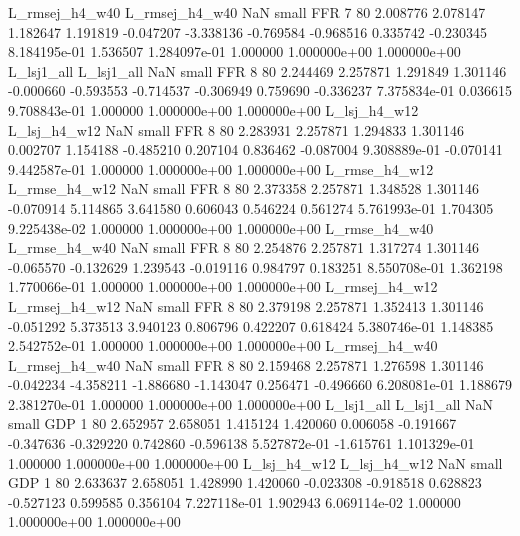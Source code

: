 L_rmsej_h4_w40 L_rmsej_h4_w40                   NaN      small      FFR                 7 80 2.008776       2.078147 1.182647       1.191819   -0.047207     -3.338136     -0.769584    -0.968516       0.335742 -0.230345 8.184195e-01     1.536507   1.284097e-01            1.000000    1.000000e+00        1.000000e+00
    L_lsj1_all     L_lsj1_all                   NaN      small      FFR                 8 80 2.244469       2.257871 1.291849       1.301146   -0.000660     -0.593553     -0.714537    -0.306949       0.759690 -0.336237 7.375834e-01     0.036615   9.708843e-01            1.000000    1.000000e+00        1.000000e+00
  L_lsj_h4_w12   L_lsj_h4_w12                   NaN      small      FFR                 8 80 2.283931       2.257871 1.294833       1.301146    0.002707      1.154188     -0.485210     0.207104       0.836462 -0.087004 9.308889e-01    -0.070141   9.442587e-01            1.000000    1.000000e+00        1.000000e+00
 L_rmse_h4_w12  L_rmse_h4_w12                   NaN      small      FFR                 8 80 2.373358       2.257871 1.348528       1.301146   -0.070914      5.114865      3.641580     0.606043       0.546224  0.561274 5.761993e-01     1.704305   9.225438e-02            1.000000    1.000000e+00        1.000000e+00
 L_rmse_h4_w40  L_rmse_h4_w40                   NaN      small      FFR                 8 80 2.254876       2.257871 1.317274       1.301146   -0.065570     -0.132629      1.239543    -0.019116       0.984797  0.183251 8.550708e-01     1.362198   1.770066e-01            1.000000    1.000000e+00        1.000000e+00
L_rmsej_h4_w12 L_rmsej_h4_w12                   NaN      small      FFR                 8 80 2.379198       2.257871 1.352413       1.301146   -0.051292      5.373513      3.940123     0.806796       0.422207  0.618424 5.380746e-01     1.148385   2.542752e-01            1.000000    1.000000e+00        1.000000e+00
L_rmsej_h4_w40 L_rmsej_h4_w40                   NaN      small      FFR                 8 80 2.159468       2.257871 1.276598       1.301146   -0.042234     -4.358211     -1.886680    -1.143047       0.256471 -0.496660 6.208081e-01     1.188679   2.381270e-01            1.000000    1.000000e+00        1.000000e+00
    L_lsj1_all     L_lsj1_all                   NaN      small      GDP                 1 80 2.652957       2.658051 1.415124       1.420060    0.006058     -0.191667     -0.347636    -0.329220       0.742860 -0.596138 5.527872e-01    -1.615761   1.101329e-01            1.000000    1.000000e+00        1.000000e+00
  L_lsj_h4_w12   L_lsj_h4_w12                   NaN      small      GDP                 1 80 2.633637       2.658051 1.428990       1.420060   -0.023308     -0.918518      0.628823    -0.527123       0.599585  0.356104 7.227118e-01     1.902943   6.069114e-02            1.000000    1.000000e+00        1.000000e+00
